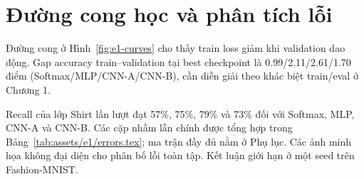 \section{Đường cong học và phân tích lỗi}
Đường cong ở Hình~\ref{fig:e1-curves} cho thấy train loss giảm khi validation
dao động. Gap accuracy train--validation tại best checkpoint là
0.99/2.11/2.61/1.70 điểm (Softmax/MLP/CNN-A/CNN-B), cần diễn giải theo
khác biệt train/eval ở Chương 1.



Recall của lớp Shirt lần lượt đạt 57\%, 75\%, 79\% và 73\% đối với
Softmax, MLP, CNN-A và CNN-B. Các cặp nhầm lẫn chính được tổng hợp trong
Bảng~\ref{tab:assets/e1/errors.tex}; ma trận đầy đủ nằm ở Phụ lục.
Các ảnh minh họa không đại diện cho phân bố lỗi toàn tập.
Kết luận giới hạn ở một seed trên Fashion-MNIST.
